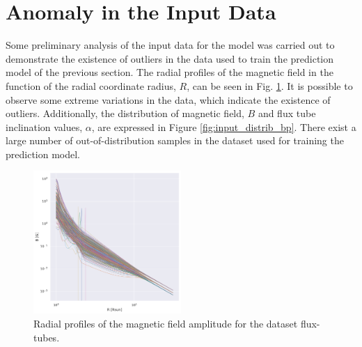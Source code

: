 \section{Anomaly in the Input Data}\label{sec:prelim_data_analysis}
Some preliminary analysis of the input data for the model was carried out to demonstrate the existence of outliers in the data used to train the prediction model of the previous section. The radial profiles of the magnetic field in the function of the radial coordinate radius, $R$, can be seen in Fig. \ref{fig:magnetic_radius_outliers}. It is possible to observe some extreme variations in the data, which indicate the existence of outliers. Additionally, the distribution of magnetic field, $B$ and flux tube inclination values, $\alpha$, are expressed in Figure \ref{fig:input_distrib_bp}. There exist a large number of out-of-distribution samples in the dataset used for training the prediction model.


\begin{figure}[ht]
\centering
\includegraphics[width=0.5\textwidth]{figures/magnetic_radius_outliers.png}
\caption{Radial profiles of the magnetic field amplitude for the dataset flux-tubes.}
\label{fig:magnetic_radius_outliers}
\end{figure}


